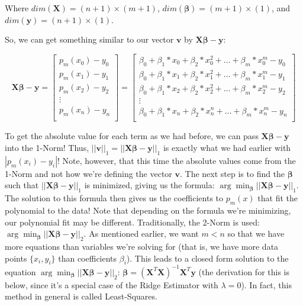\documentclass{article}
\newcommand{\V}{\mathbf{v}} %
\newcommand{\y}{\mathbf{y}}
\newcommand{\X}{\mathbf{X}}
\newcommand{\B}{\boldsymbol\beta} %
\begin{document}
Where $dim(\X)=(n+1)\times(m+1)$, $dim(\B)=(m+1)\times(1)$, and $dim(\y)=(n+1)\times(1)$.

So, we can get something similar to our vector $\V$ by $\X\B-\y$:

\begin{equation*}
    \X\B-\y = 
    \begin{bmatrix}
        p_m(x_0) - y_0 \\ 
        p_m(x_1) - y_1 \\ 
        p_m(x_2) - y_2 \\ 
        \vdots \\ 
        p_m(x_n) - y_n \\ 
    \end{bmatrix}
    =
    \begin{bmatrix}
        \beta_0 + \beta_1*x_0 + \beta_2*x_0 ^2 + \ldots + \beta_m*x_0^m - y_0\\
        \beta_0 + \beta_1*x_1 + \beta_2*x_1 ^2 + \ldots + \beta_m*x_1^m - y_1\\
        \beta_0 + \beta_1*x_2 + \beta_2*x_2 ^2 + \ldots + \beta_m*x_2^m - y_2\\
        \vdots  \\
        \beta_0 + \beta_1*x_n + \beta_2*x_n ^n + \ldots + \beta_m*x_n^m - y_n\\
    \end{bmatrix}
\end{equation*}

To get the absolute value for each term as we had before, we can pass $\X\B-\y$ into the 1-Norm! Thus, $||\V||_1=||\X\B-\y||_1$ is exactly what we had earlier with $|p_m(x_i)-y_i|$! Note, however, that this time the absolute values come from the 1-Norm and not how we're defining the vector $\V$. The next step is to find the $\B$ such that $||\X\B-\y||_1$ is minimized, giving us the formula: $\arg \min_{\B} ||\X\B-\y||_{1}$. The solution to this formula then gives us the coefficients to $p_m(x)$ that fit the polynomial to the data! Note that depending on the formula we're minimizing, our polynomial fit may be different. Traditionally, the 2-Norm is used: $\arg \min_{\B} ||\X\B-\y||_{2}$. As mentioned earlier, we want $m<n$ so that we have more equations than variables we're solving for (that is, we have more data points $\{x_i, y_i\}$ than coefficients $\beta_i$). This leads to a closed form solution to the equation $\arg \min_{\B} ||\X\B-\y||_{2}$: $\B = (\X^T\X)^{-1}\X^T \y$ (the derivation for this is below, since it's a special case of the Ridge Estimator with $\lambda=0$). In fact, this method in general is called Least-Squares.
\end{document}
